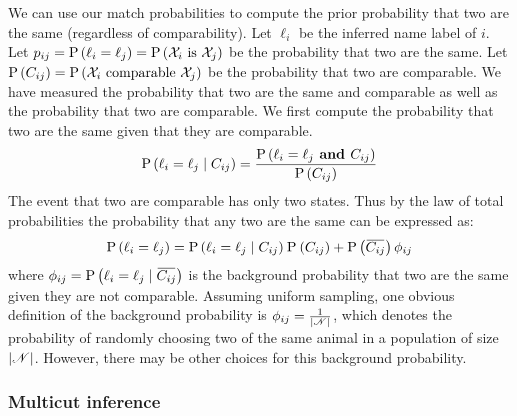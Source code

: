             We can use our match probabilities to compute the prior
              probability that two \annots{} are the same (regardless of
              comparability).
            Let $\ell_i$ be the inferred name label of \annot{} $i$.
            Let $p_{ij} = \mathbin{\mathbin{\operatorname{P}}}\left(\ell_i = \ell_j{}\right) = \mathbin{\mathbin{\operatorname{P}}}\left(\mathcal{X}_{i}\textrm{ is }\mathcal{X}_{j}\right)$ be
              the probability that two \annots{} are the same.
            Let $\mathbin{\mathbin{\operatorname{P}}}\left(C_{ij}{}\right) = \mathbin{\mathbin{\operatorname{P}}}\left(\mathcal{X}_{i}\textrm{ comparable }\mathcal{X}_{j}\right)$ be the
              probability that two \annots{} are comparable.
            We have measured the probability that two \annots{} are the same
              and comparable as well as the probability that two \annots{} are
              comparable.
            We first compute the probability that two \annots{} are the same
              given that they are comparable.
            \begin{equation}
                \mathbin{\mathbin{\operatorname{P}}}\left(\ell_i = \ell_j \mid C_{ij}\right) = \frac{ \mathbin{\mathbin{\operatorname{P}}}\left(\ell_i = \ell_j \textbf{ and } C_{ij}\right) }{\mathbin{\mathbin{\operatorname{P}}}\left(C_{ij}\right)}
            \end{equation}
            The event that two \annots{} are comparable has only two states.
            Thus by the law of total probabilities the probability that any
              two \annots{} are the same can be expressed as:
            \begin{equation}\label{eqn:psame}
                \Pr{\sameXX} = \Pr{\sameXX \given \compXX} \Pr{\compXX}
                + \Pr{\notcompXX} \bgprobXX
            \end{equation}
            where $\bgprobXX = \Pr{\sameXX \given \notcompXX}$ is the
              background probability that two \annots{} are the same given they
              are not comparable.
            Assuming uniform sampling, one obvious definition of the
              background probability is $\phi_{ij}=\frac{1}{|\mathscr{N}|}$,
              which denotes the probability of randomly choosing two \annots{}
              of the same animal in a population of size $|\mathscr{N}|$.
            However, there may be other choices for this background
              probability.

        \subsubsection{Multicut inference}

